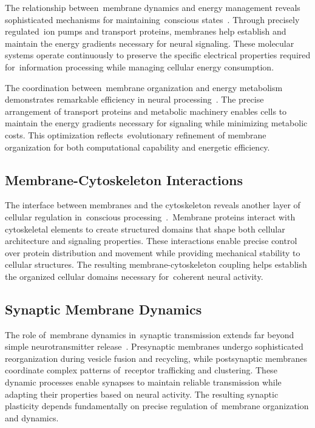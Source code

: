 The relationship between~membrane dynamics and energy management reveals sophisticated mechanisms for maintaining~conscious states~\cite{Yang2019, Attwell2001}. Through precisely regulated~ion pumps and transport proteins, membranes help establish and maintain the energy gradients necessary for neural signaling. These molecular systems operate continuously to preserve the specific electrical properties required for~information processing while managing cellular energy consumption.

The coordination between~membrane organization and energy metabolism demonstrates remarkable efficiency in neural processing~\cite{Goni2014, Attwell2001}. The precise arrangement of transport proteins and metabolic machinery enables cells to maintain the energy gradients necessary for signaling while minimizing metabolic costs. This optimization reflects~evolutionary refinement of membrane organization for both computational capability and energetic efficiency.

\subsection*{Membrane-Cytoskeleton Interactions~}

The interface between membranes and the cytoskeleton reveals another layer of cellular regulation in~conscious processing~\cite{Zimmerberg2006, Fletcher2010}.~Membrane proteins interact with cytoskeletal elements to create structured domains that shape both cellular architecture and signaling properties. These interactions enable precise control over protein distribution and movement while providing mechanical stability to cellular structures. The resulting membrane-cytoskeleton coupling helps establish the organized cellular domains necessary for~coherent neural activity.

\subsection*{Synaptic Membrane Dynamics~}

The role of~membrane dynamics in~synaptic transmission extends far beyond simple neurotransmitter release~\cite{Sudhof2013, Choquet2013}. Presynaptic membranes undergo sophisticated reorganization during vesicle fusion and recycling, while postsynaptic membranes coordinate complex patterns of~receptor trafficking and clustering. These dynamic processes enable synapses to maintain reliable transmission while adapting their properties based on neural activity. The resulting synaptic plasticity depends fundamentally on precise regulation of~membrane organization and dynamics.

